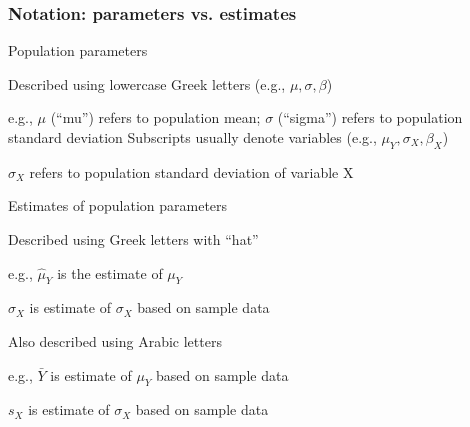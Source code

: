 \begin{comment}
\begin{frame}
	\frametitle{Parameters and point estimates}
	
	
	In introductory statistics class, the primary parameter we were interested in was the population mean, $ \mu_Y $, and the estimator we used most often was the sample mean, $ \bar{Y} $ \\
	
	\vspace{3mm}
	In multivariate regression, primary parameter we are interested in is the population regression coefficient, $ \beta $, which we estimate with the sample regression coefficient, $ \hat{\beta} $
	\vspace{2mm}
	\bi
		\item RQ: what is the effect of living in residence halls on GPA?
		\item Population regression coefficient for living on campus would tell us the true causal effect of living on campus on GPA for the entire population
	\ei
	
	
	
\end{frame}
\end{comment}

\begin{frame}
	\frametitle{Notation: parameters vs. estimates}
	
	
	Population parameters
	\bi
		\item Described using lowercase Greek letters (e.g., $ \mu, \sigma, \beta $)
		\bi
			\item e.g., $ \mu $ (``mu'') refers to population mean; $ \sigma $ (``sigma'') refers to population standard deviation
		\ei
		Subscripts usually denote variables (e.g., $ \mu_Y, \sigma_X, \beta_X $)
		\bi
			\item $ \sigma_X $ refers to population standard deviation of variable X
		\ei
	\ei
	\vspace{3mm}
	
	Estimates of population parameters
	\bi
		\item Described using Greek letters with ``hat''
		\bi
			\item e.g., $ \hat{\mu}_Y $ is the estimate of $ \mu_Y $
			\item $ \hat{\sigma}_X $ is estimate of $ \sigma_X $ based on sample data
		\ei
			\item Also described using Arabic letters
		\bi
			\item e.g., $ \bar{Y} $ is estimate of $ \mu_Y $ based on sample data
			\item $ s_X $ is estimate of $ \sigma_X $ based on sample data
		\ei
	\ei

\end{frame}

